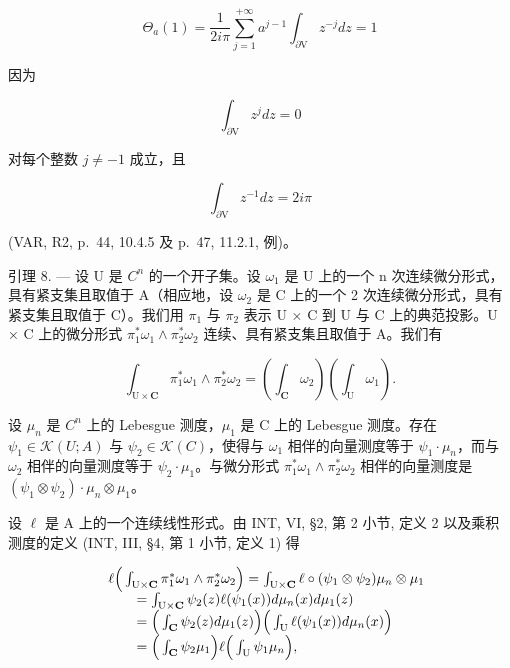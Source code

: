 \[
\Theta_ {a} (1) = \frac {1}{2 i \pi} \sum_ {j = 1} ^ {+ \infty} a ^ {j - 1} \int_ {\partial \mathrm{V}} z ^ {- j} d z = 1
\]

因为

\[
\int_ {\partial \mathrm{V}} z ^ {j} d z = 0
\]

对每个整数 \(j \neq -1\) 成立，且

\[
\int_ {\partial \mathrm{V}} z ^ {- 1} d z = 2 i \pi
\]

(VAR, R2, p.~44, 10.4.5 及 p.~47, 11.2.1, 例)。

引理 8. --- 设 U 是 \(C^{n}\) 的一个开子集。设 \(\omega_{1}\) 是 U 上的一个 n 次连续微分形式，具有紧支集且取值于 A（相应地，设 \(\omega_{2}\) 是 C 上的一个 2 次连续微分形式，具有紧支集且取值于 C）。我们用 \(\pi_{1}\) 与 \(\pi_{2}\) 表示 U × C 到 U 与 C 上的典范投影。U × C 上的微分形式 \(\pi_{1}^{*}\omega_{1} \wedge \pi_{2}^{*}\omega_{2}\) 连续、具有紧支集且取值于 A。我们有

\[
\int_ {\mathrm{U} \times \mathbf {C}} \pi_ {1} ^ {*} \omega_ {1} \wedge \pi_ {2} ^ {*} \omega_ {2} = \left(\int_ {\mathbf {C}} \omega_ {2}\right) \left(\int_ {\mathrm{U}} \omega_ {1}\right).
\]

设 \(\mu_{n}\) 是 \(C^{n}\) 上的 Lebesgue 测度，\(\mu_{1}\) 是 C 上的 Lebesgue 测度。存在 \(\psi_{1} \in \mathcal{K}(U;A)\) 与 \(\psi_{2} \in \mathcal{K}(C)\)，使得与 \(\omega_{1}\) 相伴的向量测度等于 \(\psi_{1} \cdot \mu_{n}\)，而与 \(\omega_{2}\) 相伴的向量测度等于 \(\psi_{2} \cdot \mu_{1}\)。与微分形式 \(\pi_{1}^{*}\omega_{1} \wedge \pi_{2}^{*}\omega_{2}\) 相伴的向量测度是 \((\psi_{1} \otimes \psi_{2}) \cdot \mu_{n} \otimes \mu_{1}\)。

设 \(\ell\) 是 A 上的一个连续线性形式。由 INT, VI, §2, 第 2 小节, 定义 2 以及乘积测度的定义 (INT, III, §4, 第 1 小节, 定义 1) 得

\[
\begin{array}{r l} & {\ell \Big (\int_ {\mathrm{U} \times \mathbf {C}} \pi_ {1} ^ {*} \omega_ {1} \wedge \pi_ {2} ^ {*} \omega_ {2} \Big) = \int_ {\mathrm{U} \times \mathbf {C}} \ell \circ (\psi_ {1} \otimes \psi_ {2}) \mu_ {n} \otimes \mu_ {1}} \\ & {\qquad = \int_ {\mathrm{U} \times \mathbf {C}} \psi_ {2} (z) \ell (\psi_ {1} (x)) d \mu_ {n} (x) d \mu_ {1} (z)} \\ & {\qquad = \Big (\int_ {\mathbf {C}} \psi_ {2} (z) d \mu_ {1} (z) \Big) \Big (\int_ {\mathrm{U}} \ell (\psi_ {1} (x)) d \mu_ {n} (x) \Big)} \\ & {\qquad = \Big (\int_ {\mathbf {C}} \psi_ {2} \mu_ {1} \Big) \ell \Big (\int_ {\mathrm{U}} \psi_ {1} \mu_ {n} \Big),} \end{array}
\]

